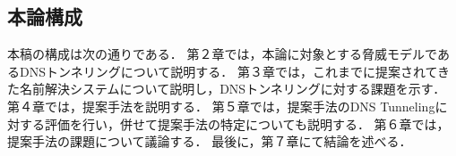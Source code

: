 \subsection{本論構成}
本稿の構成は次の通りである．
第２章では，本論に対象とする脅威モデルであるDNSトンネリングについて説明する．
第３章では，これまでに提案されてきた名前解決システムについて説明し，DNSトンネリングに対する課題を示す．
第４章では，提案手法を説明する．
第５章では，提案手法のDNS Tunnelingに対する評価を行い，併せて提案手法の特定についても説明する．
第６章では，提案手法の課題について議論する．
最後に，第７章にて結論を述べる．
